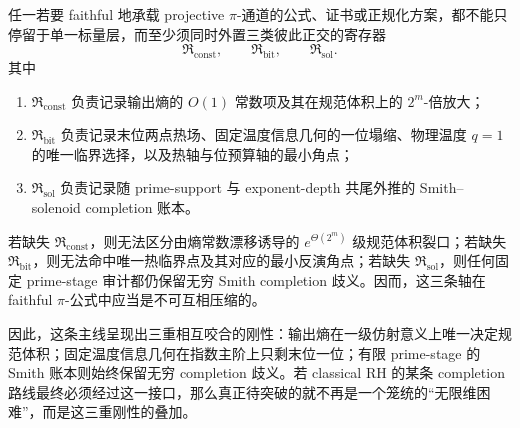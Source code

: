 \begin{conjecture}\label{conj:conclusion-pi-formula-entropy-bit-solenoid-three-register}
任一若要 faithful 地承载 projective \(\pi\)-通道的公式、证书或正规化方案，都不能只停留于单一标量层，而至少须同时外置三类彼此正交的寄存器
\[
\mathfrak R_{\mathrm{const}},
\qquad
\mathfrak R_{\mathrm{bit}},
\qquad
\mathfrak R_{\mathrm{sol}}.
\]
其中
\begin{enumerate}
  \item \(\mathfrak R_{\mathrm{const}}\) 负责记录输出熵的 \(O(1)\) 常数项及其在规范体积上的 \(2^m\)-倍放大；
  \item \(\mathfrak R_{\mathrm{bit}}\) 负责记录末位两点热场、固定温度信息几何的一位塌缩、物理温度 \(q=1\) 的唯一临界选择，以及热轴与位预算轴的最小角点；
  \item \(\mathfrak R_{\mathrm{sol}}\) 负责记录随 prime-support 与 exponent-depth 共尾外推的 Smith--solenoid completion 账本。
\end{enumerate}
若缺失 \(\mathfrak R_{\mathrm{const}}\)，则无法区分由熵常数漂移诱导的 \(e^{\Theta(2^m)}\) 级规范体积裂口；若缺失 \(\mathfrak R_{\mathrm{bit}}\)，则无法命中唯一热临界点及其对应的最小反演角点；若缺失 \(\mathfrak R_{\mathrm{sol}}\)，则任何固定 prime-stage 审计都仍保留无穷 Smith completion 歧义。因而，这三条轴在 faithful \(\pi\)-公式中应当是不可互相压缩的。
\end{conjecture}

\noindent
因此，这条主线呈现出三重相互咬合的刚性：输出熵在一级仿射意义上唯一决定规范体积；固定温度信息几何在指数主阶上只剩末位一位；有限 prime-stage 的 Smith 账本则始终保留无穷 completion 歧义。若 classical RH 的某条 completion 路线最终必须经过这一接口，那么真正待突破的就不再是一个笼统的“无限维困难”，而是这三重刚性的叠加。

\endinput
